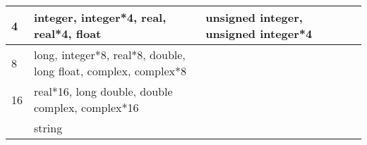 {\begin{longtable}{llllll}
\hline
\multicolumn{1}{p{0.051in}|}{\begin{minipage}[t]{0.051in}\centering
{\small 4}\end{minipage}} & \multicolumn{1}{p{0.051in}|}{\begin{minipage}[t]{0.051in}\centering
{\small integer, integer*4, real, real*4, float}\end{minipage}} & \multicolumn{1}{p{0.051in}|}{\begin{minipage}[t]{0.051in}\raggedright
{\small unsigned integer, unsigned integer*4}\end{minipage}}\\
\hline
\multicolumn{1}{|p{0.287in}|}{\begin{minipage}[t]{0.287in}\centering
{\small 8}\end{minipage}} & \multicolumn{1}{p{2.534in}|}{\begin{minipage}[t]{2.534in}\centering
{\small long, integer*8, real*8, double, long float, complex, complex*8}\end{minipage}} & \multicolumn{4}{p{1.680in}|}{\begin{minipage}[t]{1.680in}\raggedright
\end{minipage}}\\
\hline
\multicolumn{1}{p{0.051in}|}{\begin{minipage}[t]{0.051in}\centering
{\small 16}\end{minipage}} & \multicolumn{1}{p{0.051in}|}{\begin{minipage}[t]{0.051in}\centering
{\small real*16, long double, double complex, complex*16}\end{minipage}} & \multicolumn{1}{p{0.051in}|}{\begin{minipage}[t]{0.051in}\centering
\end{minipage}}\\
\hline
\multicolumn{1}{|p{0.287in}|}{\begin{minipage}[t]{0.287in}\centering
\end{minipage}} & \multicolumn{1}{p{2.534in}|}{\begin{minipage}[t]{2.534in}\centering
{\small string}\end{minipage}} & \multicolumn{4}{p{1.680in}|}{\begin{minipage}[t]{1.680in}\raggedright
\end{minipage}}\\
\hline
\end{longtable}
\label{HToc182553462}}

